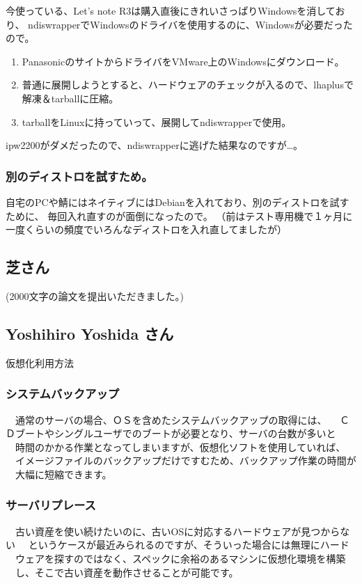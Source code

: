\documentclass[mingoth,a4paper]{jsarticle}
\begin{document}
今使っている、Let's note R3は購入直後にきれいさっぱりWindowsを消しており、
ndiswrapperでWindowsのドライバを使用するのに、Windowsが必要だったので。

\begin{enumerate}
 \item PanasonicのサイトからドライバをVMware上のWindowsにダウンロード。
 \item 普通に展開しようとすると、ハードウェアのチェックが入るので、lhaplusで解凍＆tarballに圧縮。
 \item tarballをLinuxに持っていって、展開してndiswrapperで使用。
\end{enumerate}

ipw2200がダメだったので、ndiswrapperに逃げた結果なのですが…。


\subsubsection{別のディストロを試すため。}

自宅のPCや鯖にはネイティブにはDebianを入れており、別のディストロを試すために、
毎回入れ直すのが面倒になったので。
（前はテスト専用機で１ヶ月に一度くらいの頻度でいろんなディストロを入れ直してましたが）


\subsection{芝さん}

(2000文字の論文を提出いただきました。)

\subsection{Yoshihiro Yoshida さん}

仮想化利用方法

\subsubsection{システムバックアップ}
　通常のサーバの場合、ＯＳを含めたシステムバックアップの取得には、
　ＣＤブートやシングルユーザでのブートが必要となり、サーバの台数が多いと
　時間のかかる作業となってしまいますが、仮想化ソフトを使用していれば、
　イメージファイルのバックアップだけですむため、バックアップ作業の時間が
　大幅に短縮できます。

\subsubsection{サーバリプレース}
　古い資産を使い続けたいのに、古いOSに対応するハードウェアが見つからない
　というケースが最近みられるのですが、そういった場合には無理にハード
　ウェアを探すのではなく、スペックに余裕のあるマシンに仮想化環境を構築
　し、そこで古い資産を動作させることが可能です。
\end{document}
